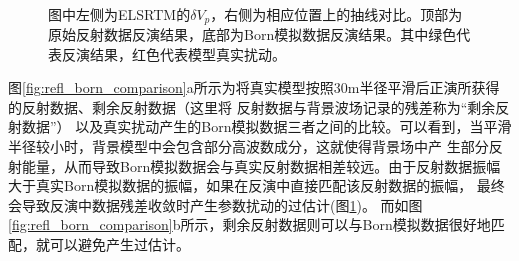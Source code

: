 \begin{figure}[!htb]
   \centering
   \\
   \caption{图中左侧为ELSRTM的$\delta
	   V_p$，右侧为相应位置上的抽线对比。顶部为原始反射数据反演结果，底部为Born模拟数据反演结果。其中绿色代表反演结果，红色代表模型真实扰动。}
   \label{fig:Vpcomparison}
\end{figure}

图\ref{fig:refl_born_comparison}a所示为将真实模型按照30m半径平滑后正演所获得的反射数据、剩余反射数据（这里将
反射数据与背景波场记录的残差称为“剩余反射数据”）
以及真实扰动产生的Born模拟数据三者之间的比较。可以看到，当平滑半径较小时，背景模型中会包含部分高波数成分，这就使得背景场中产
生部分反射能量，从而导致Born模拟数据会与真实反射数据相差较远。由于反射数据振幅大于真实Born模拟数据的振幅，如果在反演中直接匹配该反射数据的振幅，
最终会导致反演中数据残差收敛时产生参数扰动的过估计(图\ref{fig:Vpcomparison})。
而如图\ref{fig:refl_born_comparison}b所示，剩余反射数据则可以与Born模拟数据很好地匹配，就可以避免产生过估计。

